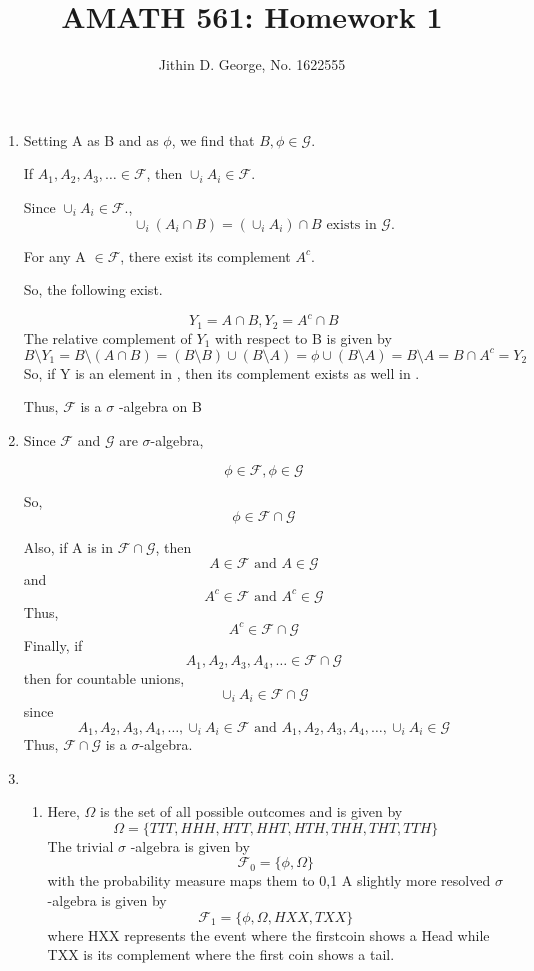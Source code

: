 \documentclass[a4paper,11pt]{article}
\title{AMATH 561: Homework 1}
\author{Jithin D. George, No. 1622555}
\begin{document}
\maketitle
\begin{enumerate}

	\item
Setting A as B and as $\phi$, we find that $B,\phi\in \mathcal{G}$.

If $A_1,A_2,A_3,\ldots \in \mathcal{F}$, then $\cup_{i}A_i \in \mathcal{F}$.

Since $\cup_{i}A_i \in \mathcal{F}$.,
\[\cup_{i}(A_i\cap B) = (\cup_{i}A_i)\cap B \text{ exists in } \mathcal{G}.\]

For any A $\in \mathcal{F}$, there exist its complement $A^c$.

So, the following exist.

\[Y_1=A \cap B, Y_2=A^c \cap B\]
The relative complement of $Y_1$ with respect to B is given by
\[B\setminus Y_1 = B\setminus(A \cap B)= (B\setminus B)\cup(B\setminus A)=\phi \cup (B\setminus A)=B\setminus A = B\cap A^c = Y_2\]
So, if Y is an element in , then its complement exists as well in .



Thus, $\mathcal{F}$ is a $\sigma$ -algebra on B

\item
Since $\mathcal{F}$ and $\mathcal{G}$ are $\sigma$-algebra,

\[ \phi \in \mathcal{F}, \phi \in \mathcal{G}\]

So, \[\phi \in \mathcal{F} \cap \mathcal{G}\]

Also, if A is in $\mathcal{F}\cap \mathcal{G}$, then 
\[A \in \mathcal{F} \text{  and  } A \in \mathcal{G}\]
and
\[A^c \in \mathcal{F} \text{  and  } A^c \in \mathcal{G}\]
Thus, \[A^c \in \mathcal{F} \cap \mathcal{G}\]
Finally, if
\[A_1,A_2,A_3,A_4,\ldots \in \mathcal{F} \cap \mathcal{G} \]
then for countable unions,
\[\cup_i A_i \in \mathcal{F} \cap \mathcal{G}\]
since 
\[A_1,A_2,A_3,A_4,\ldots, \cup_i A_i \in \mathcal{F} \text{  and  }A_1,A_2,A_3,A_4,\ldots, \cup_i A_i \in \mathcal{G}\]
Thus, $\mathcal{F} \cap \mathcal{G}$ is a $\sigma$-algebra.

\item
\begin{enumerate}
 \item Here, $\Omega$ is the set of all possible outcomes and is given by
 \[\Omega =\{TTT,HHH,HTT,HHT,HTH,THH,THT,TTH\}\]
 The trivial $\sigma$ -algebra is given by
 \[\mathcal{F_0}= \{\phi,\Omega\}\] with the probability measure maps them to {0,1}
 A slightly more resolved $\sigma$ -algebra is given by
 \[\mathcal{F}_1= \{\phi,\Omega,HXX ,TXX \}\] where HXX represents the event where the firstcoin shows a Head while
 TXX is its complement where the first coin shows a tail.
 

\end{enumerate}
\end{enumerate}
\end{document}
